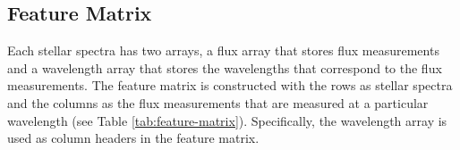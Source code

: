 \documentclass[conference]{IEEEtran}
\begin{document}
	\subsection{Feature Matrix}\label{sec:feature}

        Each stellar spectra has two arrays, a flux array that stores flux measurements and a wavelength array that stores the wavelengths that correspond to the flux measurements. The feature matrix is constructed with the rows as stellar spectra and the columns as the flux measurements that are measured at a particular wavelength (see Table \ref{tab:feature-matrix}). Specifically, the wavelength array is used as column headers in the feature matrix. 

\begin{table}
        \centering
        \caption{Example of the feature matrix}
        \label{tab:feature-matrix}
\end{table}
\end{document}

